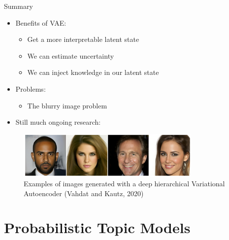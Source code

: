 \documentclass[10pt]{beamer}
\begin{document}
\begin{frame}{Summary}

\begin{itemize}
\item Benefits of VAE:
\begin{itemize}
\item Get a more interpretable latent state
\item We can estimate uncertainty
\item We can inject knowledge in our latent state
\end{itemize}
\pause
\item Problems:
\begin{itemize}
\item The blurry image problem %
\end{itemize}
\pause
\item Still much ongoing research:
\end{itemize}

\begin{figure}[h]
\centering
\includegraphics[width=0.8\textwidth]{fig/Vahdat_Kautz_NVEA_2020.png}
\caption{Examples of images generated with a deep hierarchical Variational Autoencoder (Vahdat and Kautz, 2020)}
\end{figure}

\end{frame}



\section{Probabilistic Topic Models}
\frame{\sectionpage}

\frame{\sectionpage}
\end{document}
